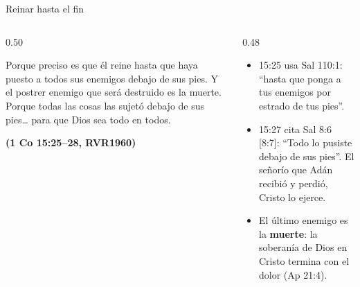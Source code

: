 \documentclass[hyperref={bookmarks=false},aspectratio=169]{beamer}
\newcommand{\fuente}[1]{\par\hfill{\upshape\bfseries\footnotesize\textcolor{azul}{#1}}}
\newcommand{\destacar}[1]{\textbf{\textcolor{azul}{#1}}}
\begin{document}
\begin{frame}{Reinar hasta el fin}
\begin{columns}[t,onlytextwidth]
\begin{column}{0.50\textwidth}
\begin{cita}Porque preciso es que él reine hasta que haya puesto a todos sus enemigos debajo de sus pies. Y el postrer enemigo que será destruido es la muerte. Porque todas las cosas las sujetó debajo de sus pies\ldots{} para que Dios sea todo en todos.\fuente{(1 Co 15:25--28, RVR1960)}\end{cita}
\end{column}
\begin{column}{0.48\textwidth}\small
\begin{itemize}
\item 15:25 usa Sal 110:1: ``hasta que ponga a tus enemigos por estrado de tus pies''.
\item 15:27 cita Sal 8:6 [8:7]: ``Todo lo pusiste debajo de sus pies''. El señorío que Adán recibió y perdió, Cristo lo ejerce.
\item El último enemigo es la \destacar{muerte}: la soberanía de Dios en Cristo termina con el dolor (Ap 21:4).
\end{itemize}
\end{column}
\end{columns}\par\smallskip
\centering
{}
\end{frame}
\end{document}
